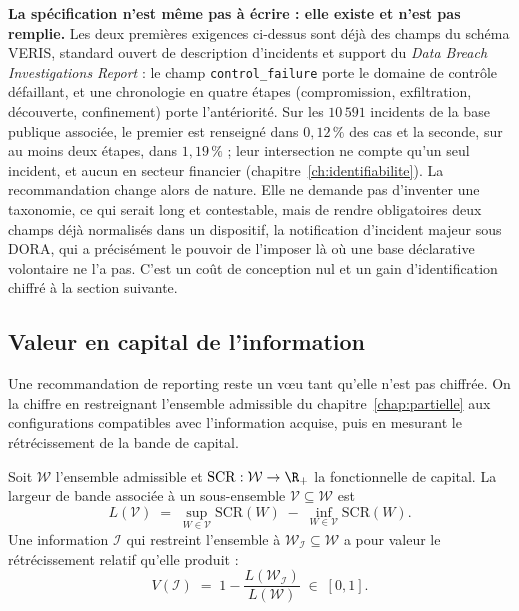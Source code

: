\begin{cle}
\textbf{La spécification n'est même pas à écrire : elle existe et n'est pas remplie.} Les deux
premières exigences ci-dessus sont déjà des champs du schéma VERIS, standard ouvert de
description d'incidents et support du \emph{Data Breach Investigations Report} : le champ
\texttt{control\_failure} porte le domaine de contrôle défaillant, et une chronologie en quatre
étapes (compromission, exfiltration, découverte, confinement) porte l'antériorité. Sur les
$10\,591$ incidents de la base publique associée, le premier est renseigné dans $0{,}12\,\%$ des
cas et la seconde, sur au moins deux étapes, dans $1{,}19\,\%$ ; leur intersection ne
compte qu'un seul incident, et aucun en secteur financier
(chapitre~\ref{ch:identifiabilite}). La recommandation change alors de nature. Elle ne demande
pas d'inventer une taxonomie, ce qui serait long et contestable, mais de rendre
obligatoires deux champs déjà normalisés dans un dispositif, la notification
d'incident majeur sous DORA, qui a précisément le pouvoir de l'imposer là où une base
déclarative volontaire ne l'a pas. C'est un coût de conception nul et un gain d'identification
chiffré à la section suivante.
\end{cle}




\subsection{Valeur en capital de l'information}

Une recommandation de reporting reste un v\oe u tant qu'elle n'est pas chiffrée. On la chiffre en
restreignant l'ensemble admissible du chapitre~\ref{chap:partielle} aux configurations compatibles
avec l'information acquise, puis en mesurant le rétrécissement de la bande de capital.

\begin{definition}%
Soit $\mathcal{W}$ l'ensemble admissible et $\mathrm{SCR}:\mathcal{W}\to\R_+$ la fonctionnelle de
capital. La largeur de bande associée à un sous-ensemble $\mathcal{V}\subseteq\mathcal{W}$ est
\begin{equation}
  L(\mathcal{V}) \;=\; \sup_{W\in\mathcal{V}}\mathrm{SCR}(W)\;-\;\inf_{W\in\mathcal{V}}\mathrm{SCR}(W).
\end{equation}
Une information $\mathcal{I}$ qui restreint l'ensemble à $\mathcal{W}_{\mathcal{I}}\subseteq
\mathcal{W}$ a pour valeur le rétrécissement relatif qu'elle produit :
\begin{equation}
  V(\mathcal{I}) \;=\; 1-\frac{L(\mathcal{W}_{\mathcal{I}})}{L(\mathcal{W})} \;\in\;[0,1].
\end{equation}
\end{definition}

